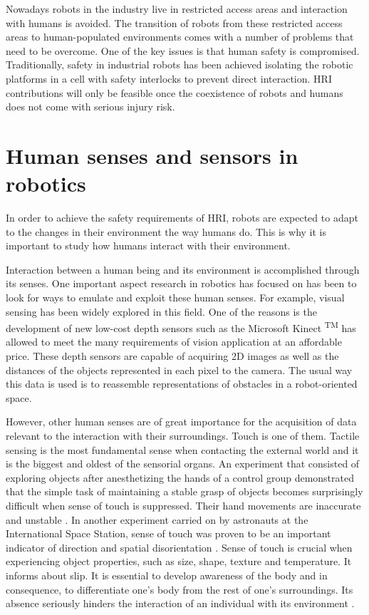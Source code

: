 Nowadays robots in the industry live in restricted access areas and interaction with humans is avoided. The transition of robots from these restricted access areas to human-populated environments comes with a number of problems that need to be overcome. One of the key issues is that human safety is compromised. Traditionally, safety in industrial robots has been achieved isolating the robotic platforms in a cell with safety interlocks to prevent direct interaction. HRI contributions will only be feasible once the coexistence of robots and humans does not come with serious injury risk.

\section{Human senses and sensors in robotics}
In order to achieve the safety requirements of HRI, robots are expected to adapt to the changes in their environment the way humans do. This is why it is important to study how humans interact with their environment.

Interaction between a human being and its environment is accomplished through its senses. One important aspect research in robotics has focused on has been to look for ways to emulate and exploit these human senses. For example, visual sensing has been widely explored in this field. One of the reasons is the development of new low-cost depth sensors such as the Microsoft Kinect \textsuperscript{TM} has allowed to meet the many requirements of vision application at an affordable price. These depth sensors are capable of acquiring 2D images as well as the distances of the objects represented in each pixel to the camera. The usual way this data is used is to reassemble representations of obstacles in a robot-oriented space.

However, other human senses are of great importance for the acquisition of data relevant to the interaction with their surroundings. Touch is one of them. Tactile sensing is the most fundamental sense when contacting the external world and it is the biggest and oldest of the sensorial organs. An experiment that consisted of exploring objects after anesthetizing the hands of a control group demonstrated that the simple task of maintaining a stable grasp of objects becomes surprisingly difficult when sense of touch is suppressed. Their hand movements are inaccurate and unstable \cite{westling1984factors}. In another experiment carried on by astronauts at the International Space Station, sense of touch was proven to be an important indicator of direction and spatial disorientation \cite{van2006touch}. Sense of touch is crucial when experiencing object properties, such as size, shape, texture and temperature. It informs about slip. It is essential to develop awareness of the body and in consequence, to differentiate one’s body from the rest of one’s surroundings. Its absence seriously hinders the interaction of an individual with its environment \cite{dahiya2009tactile}.

